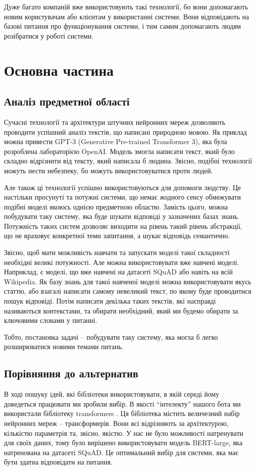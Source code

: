 \documentclass[a4paper,14pt]{extreport}
\newcommand\chap[1]{%
  \chapter*{#1}%
  \addcontentsline{toc}{chapter}{\uppercase{#1}}}
\begin{document}
    Дуже багато компаній вже використовують такі технології, бо вони допомагають новим користувачам або клієнтам у використанні системи. Вони відповідають на базові питання про функціонування системи, і тим самим допомагають людям розібратися у роботі системи. 

\chap{Основна частина}
\section{Аналіз предметної області}
    Сучасні технології та архітектури штучних нейронних мереж дозволяють проводити успішний аналіз текстів, що написані природною мовою. Як приклад можна привести GPT-3 (Generative Pre-trained Transformer 3), яка була розроблена лабораторією OpenAI. Модель змогла написати текст, який було складно відрізнити від тексту, який написала б людина. Звісно, подібні технології можуть нести небезпеку, бо можуть використовуватися проти людей.

    Але також ці технології успішно використовуються для допомоги людству. Це настільки просунуті та потужні системи, що немає жодного сенсу обмежувати подібні моделі якоюсь однією предметною областю. Замість цього, можна побудувати таку систему, яка буде шукати відповіді у зазначених базах знань. Потужність таких систем дозволяє виходити на рівень такий рівень абстракції, що не враховує конкретної теми запитання, а шукає відповідь семантично.

    Звісно, щоб мати можливість навчати та запускати моделі такої складності необхідні великі потужності. Але можна використовувати вже навчені моделі. Наприклад, є моделі, що вже навчені на датасеті SQuAD або навіть на всій Wikipedia. Як базу знань для такої навченої моделі можна використовувати якусь статтю, або взагалі написати самому невеликий текст, по якому буде проводитися пошук відповіді. Потім написати декілька таких текстів, які насправді називаються контекстами, та обирати необхідний, який ми будемо обирати за ключовими словами у питанні.

    Тобто, постановка задачі -- побудувати таку систему, яка могла б легко розширюватися новими темами питань.

\section{Порівняння до альтернатив}
В ході пошуку ідей, які бібліотеки використовувати, в якій середі йому доведеться працювати ми зробили вибір. В якості ``інтелекту'' нашого бота ми використали бібліотеку transformers \cite{transformers:repo}. Ця бібліотека містить величезний набір нейронних мереж -- трансформерів. Вони всі відрізняють за архітектурою, кількістю параметрів та, звісно, якістю. У нас не було можливості натренувати для своїх даних, тому було вирішено використовувати модель BERT-large, яка натренована на датасеті SQuAD. Це оптимальний вибір для системи, яка має бути здатна відповідати на питання.
\end{document}
